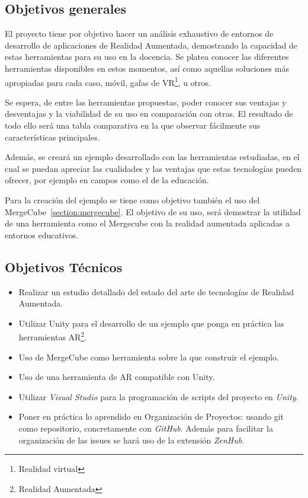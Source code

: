
\subsection{Objetivos generales}
El proyecto tiene por objetivo hacer un análisis exhaustivo de entornos de desarrollo de aplicaciones de Realidad Aumentada, demostrando la capacidad de estas herramientas para su uso en la docencia. Se platea conocer las diferentes herramientas disponibles en estos momentos, así como aquellas soluciones más apropiadas para cada caso, móvil, gafas de VR\footnote{Realidad virtual}, u otros.

Se espera, de entre las herramientas propuestas, poder conocer sus ventajas y desventajas y la viabilidad de su uso en comparación con otras. El resultado de todo ello será una tabla comparativa en la que observar fácilmente sus características principales.

Además, se creará un ejemplo desarrollado con las herramientas estudiadas, en el cual se puedan apreciar las cualidades y las ventajas que estas tecnologías pueden ofrecer, por ejemplo en campos como el de la educación.

Para la creación del ejemplo se tiene como objetivo también el uso del MergeCube~\ref{section:mergecube}. El objetivo de su uso, será demostrar la utilidad de una herramienta como el Mergecube con la realidad aumentada aplicadas a entornos educativos.

 

\subsection{Objetivos Técnicos}
\begin{itemize}
\item Realizar un estudio detallado del estado del arte de tecnologías de Realidad Aumentada. 	
\item Utilizar Unity para el desarrollo de un ejemplo que ponga en práctica las herramientas AR\footnote{Realidad Aumentada}.
\item Uso de MergeCube como herramienta sobre la que construir el ejemplo.
\item Uso de una herramienta de AR compatible con Unity.
\item Utilizar \textit{Visual Studio} para la programación de scripts del proyecto en \textit{Unity}.
\item Poner en práctica lo aprendido en Organización de Proyectos: usando git como repositorio, concretamente con \textit{GitHub}. Además para facilitar la organización de las issues  se hará uso de la extensión \textit{ZenHub}.

	
\end{itemize}

